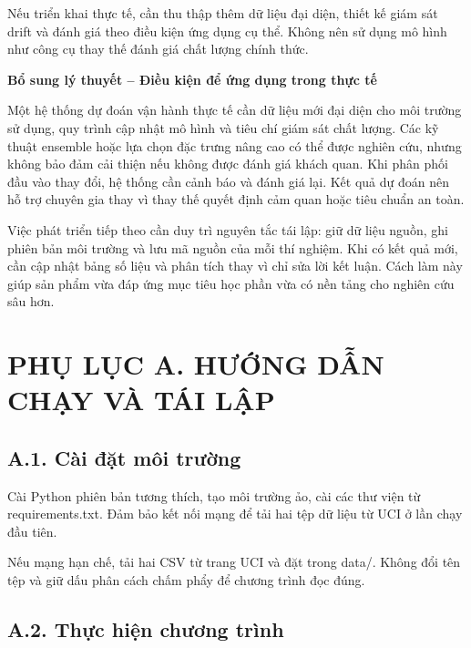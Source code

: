 \documentclass[12pt,a4paper,oneside]{article}
\begin{document}
Nếu triển khai thực tế, cần thu thập thêm dữ liệu đại diện, thiết kế
giám sát drift và đánh giá theo điều kiện ứng dụng cụ thể. Không nên sử
dụng mô hình như công cụ thay thế đánh giá chất lượng chính thức.


\par\noindent\textbf{Bổ sung lý thuyết -- Điều kiện để ứng dụng trong thực tế}\par
Một hệ thống dự đoán vận hành thực tế cần dữ liệu mới đại diện cho môi trường sử dụng, quy trình cập nhật mô hình và tiêu chí giám sát chất lượng. Các kỹ thuật ensemble hoặc lựa chọn đặc trưng nâng cao có thể được nghiên cứu, nhưng không bảo đảm cải thiện nếu không được đánh giá khách quan. Khi phân phối đầu vào thay đổi, hệ thống cần cảnh báo và đánh giá lại. Kết quả dự đoán nên hỗ trợ chuyên gia thay vì thay thế quyết định cảm quan hoặc tiêu chuẩn an toàn.\par

Việc phát triển tiếp theo cần duy trì nguyên tắc tái lập: giữ dữ liệu nguồn, ghi phiên bản môi trường và lưu mã nguồn của mỗi thí nghiệm. Khi có kết quả mới, cần cập nhật bảng số liệu và phân tích thay vì chỉ sửa lời kết luận. Cách làm này giúp sản phẩm vừa đáp ứng mục tiêu học phần vừa có nền tảng cho nghiên cứu sâu hơn.\par

\section*{PHỤ LỤC A. HƯỚNG DẪN CHẠY VÀ TÁI LẬP}

\subsection*{A.1. Cài đặt môi trường}

Cài Python phiên bản tương thích, tạo môi trường ảo, cài các thư viện từ
requirements.txt. Đảm bảo kết nối mạng để tải hai tệp dữ liệu từ UCI ở
lần chạy đầu tiên.

Nếu mạng hạn chế, tải hai CSV từ trang UCI và đặt trong data/. Không đổi
tên tệp và giữ dấu phân cách chấm phẩy để chương trình đọc đúng.

\subsection*{A.2. Thực hiện chương trình}
\end{document}
